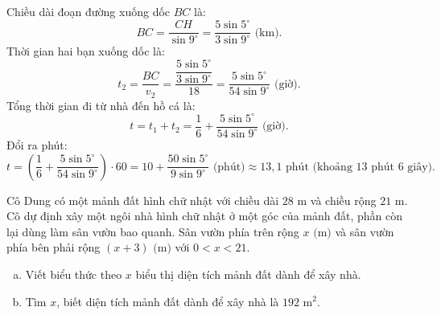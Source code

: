 \begin{bt}
{\begin{enumerate}[a)]
    Chiều dài đoạn đường xuống dốc $BC$ là:
    $$BC = \dfrac{CH}{\sin 9^\circ} = \dfrac{5\sin 5^\circ}{3\sin 9^\circ}\text{ (km)}.$$
    Thời gian hai bạn xuống dốc là:
    $$t_2 = \dfrac{BC}{v_2} = \dfrac{\dfrac{5\sin 5^\circ}{3\sin 9^\circ}}{18} = \dfrac{5\sin 5^\circ}{54\sin 9^\circ}\text{ (giờ)}.$$
    Tổng thời gian đi từ nhà đến hồ cá là:
    $$t = t_1 + t_2 = \dfrac{1}{6} + \dfrac{5\sin 5^\circ}{54\sin 9^\circ}\text{ (giờ)}.$$
    Đổi ra phút:
    $$t = \left(\dfrac{1}{6} + \dfrac{5\sin 5^\circ}{54\sin 9^\circ}\right) \cdot 60 = 10 + \dfrac{50\sin 5^\circ}{9\sin 9^\circ}\text{ (phút)} \approx 13{,}1\text{ phút (khoảng 13 phút 6 giây)}.$$
\end{enumerate}
}
\end{bt}


\begin{bt}%
Cô Dung có một mảnh đất hình chữ nhật với chiều dài $28\text{ m}$ và chiều rộng $21\text{ m}$. Cô dự định xây một ngôi nhà hình chữ nhật ở một góc của mảnh đất, phần còn lại dùng làm sân vườn bao quanh. Sân vườn phía trên rộng $x\text{ (m)}$ và sân vườn phía bên phải rộng $(x + 3)\text{ (m)}$ với $0 < x < 21$.
\begin{enumerate}[a)]
    \item Viết biểu thức theo $x$ biểu thị diện tích mảnh đất dành để xây nhà.
    \item Tìm $x$, biết diện tích mảnh đất dành để xây nhà là $192\text{ m}^2$.
\end{enumerate}
\end{bt}


